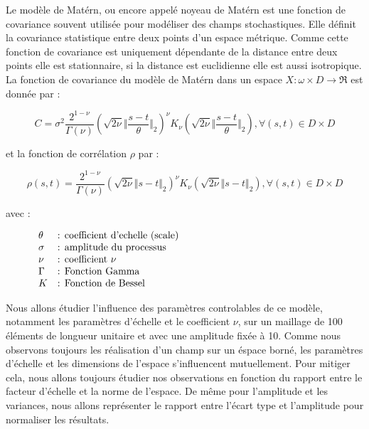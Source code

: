 \documentclass[a4paper,10pt]{article}
\begin{document}
	Le modèle de Matérn, ou encore appelé noyeau de Matérn est une fonction de covariance souvent utilisée pour modéliser des champs stochastiques. Elle définit la covariance statistique entre deux points d'un espace métrique. Comme cette fonction de covariance est uniquement dépendante de la distance entre deux points elle est stationnaire, si la distance est euclidienne elle est aussi isotropique. \\
	
	La fonction de covariance du modèle de Matérn dans un espace $X : \omega \times D \rightarrow \Re $ est donnée par : 
	
	\begin{equation}
	C = \sigma^{2}\frac{2^{1-\nu}}{\Gamma(\nu)}\left(\sqrt{2\nu}\Vert\frac{s-t}{\theta}\Vert_{2}\right)^{\nu} K_{\nu} \left(\sqrt{2\nu}\Vert\frac{s-t}{\theta}\Vert_{2}\right) , \forall(s,t) \in D \times D
	\end{equation}
	
	et la fonction de corrélation $ \rho $ par : 
	
	\begin{equation}
	\rho(s,t) = \frac{2^{1-\nu}}{\Gamma(\nu)}\left(\sqrt{2\nu}\Vert s-t \Vert_{2}\right)^{\nu} K_{\nu} \left(\sqrt{2\nu}\Vert s-t \Vert_{2}\right) , \forall(s,t) \in D \times D
	\end{equation}

	avec :
	
   \[
      \begin{array}{lp{0.8\linewidth}}	
	    \theta & : coefficient d'echelle (scale) \\
	    \sigma & : amplitude du processus \\
		\nu    & : coefficient $\nu$ 	\\
		\Gamma & : Fonction Gamma \\
		K      & : Fonction de Bessel
      \end{array}
   \]	

	Nous allons  étudier l'influence des paramètres controlables de ce modèle, notamment les paramètres d'échelle et le coefficient $\nu$, sur un maillage de 100 éléments de longueur unitaire et avec une amplitude fixée à 10. 
	Comme nous observons toujours les réalisation d'un champ sur un éspace borné, les paramètres d'échelle et les dimensions de l'espace s'influencent mutuellement. Pour mitiger cela, nous allons toujours étudier nos observations en fonction du rapport entre le facteur d'échelle et la norme de l'espace. De même pour l'amplitude et les variances, nous allons représenter le rapport entre l'écart type et l'amplitude pour normaliser les résultats. \\
	
\end{document}
